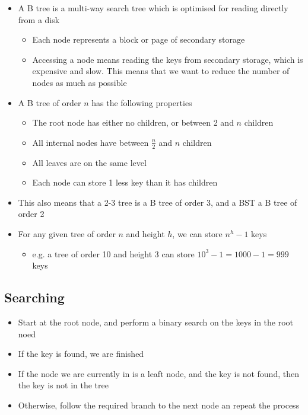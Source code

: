 \begin{itemize}
  \item A B tree is a multi-way search tree which is optimised for reading directly from a disk
  \begin{itemize}
    \item Each node represents a block or page of secondary storage
    \item Accessing a node means reading the keys from secondary storage, which is expensive and slow. This means that we want to reduce the number of nodes as much as possible
  \end{itemize}
  \item A B tree of order $n$ has the following properties
  \begin{itemize}
    \item The root node has either no children, or between 2 and $n$ children
    \item All internal nodes have between $\frac{n}{2}$ and $n$ children
    \item All leaves are on the same level
    \item Each node can store 1 less key than it has children
  \end{itemize}
  \item This also means that a 2-3 tree is a B tree of order 3, and a BST a B tree of order 2
  \item For any given tree of order $n$ and height $h$, we can store $n^h - 1$ keys
  \begin{itemize}
    \item e.g. a tree of order 10 and height 3 can store $10^3 - 1 = 1000 - 1 = 999$ keys
  \end{itemize}
\end{itemize}

\subsection*{Searching}

\begin{itemize}
  \item Start at the root node, and perform a binary search on the keys in the root noed
  \item If the key is found, we are finished
  \item If the node we are currently in is a leaft node, and the key is not found, then the key is not in the tree
  \item Otherwise, follow the required branch to the next node an repeat the process
\end{itemize}

